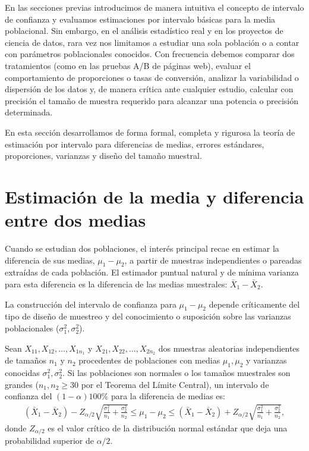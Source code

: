 En las secciones previas introducimos de manera intuitiva el concepto de intervalo de confianza y evaluamos estimaciones por intervalo básicas para la media poblacional. Sin embargo, en el análisis estadístico real y en los proyectos de ciencia de datos, rara vez nos limitamos a estudiar una sola población o a contar con parámetros poblacionales conocidos. Con frecuencia debemos comparar dos tratamientos (como en las pruebas A/B de páginas web), evaluar el comportamiento de proporciones o tasas de conversión, analizar la variabilidad o dispersión de los datos y, de manera crítica ante cualquier estudio, calcular con precisión el tamaño de muestra requerido para alcanzar una potencia o precisión determinada.

En esta sección desarrollamos de forma formal, completa y rigurosa la teoría de estimación por intervalo para diferencias de medias, errores estándares, proporciones, varianzas y diseño del tamaño muestral.

\section{Estimación de la media y diferencia entre dos medias}

Cuando se estudian dos poblaciones, el interés principal recae en estimar la diferencia de sus medias, $\mu_1 - \mu_2$, a partir de muestras independientes o pareadas extraídas de cada población. El estimador puntual natural y de mínima varianza para esta diferencia es la diferencia de las medias muestrales: $\bar{X}_1 - \bar{X}_2$.

La construcción del intervalo de confianza para $\mu_1 - \mu_2$ depende críticamente del tipo de diseño de muestreo y del conocimiento o suposición sobre las varianzas poblacionales ($\sigma_1^2, \sigma_2^2$).

\begin{teorema}
	Sean $X_{11}, X_{12}, \ldots, X_{1n_1}$ y $X_{21}, X_{22}, \ldots, X_{2n_2}$ dos muestras aleatorias independientes de tamaños $n_1$ y $n_2$ procedentes de poblaciones con medias $\mu_1, \mu_2$ y varianzas conocidas $\sigma_1^2, \sigma_2^2$. Si las poblaciones son normales o los tamaños muestrales son grandes ($n_1, n_2 \geq 30$ por el Teorema del Límite Central), un intervalo de confianza del $(1-\alpha)100\%$ para la diferencia de medias es:
	\begin{align}
		(\bar{X}_1 - \bar{X}_2) - Z_{\alpha/2} \sqrt{\frac{\sigma_1^2}{n_1} + \frac{\sigma_2^2}{n_2}} \leq \mu_1 - \mu_2 \leq (\bar{X}_1 - \bar{X}_2) + Z_{\alpha/2} \sqrt{\frac{\sigma_1^2}{n_1} + \frac{\sigma_2^2}{n_2}},
	\end{align}
	donde $Z_{\alpha/2}$ es el valor crítico de la distribución normal estándar que deja una probabilidad superior de $\alpha/2$.
\end{teorema}

